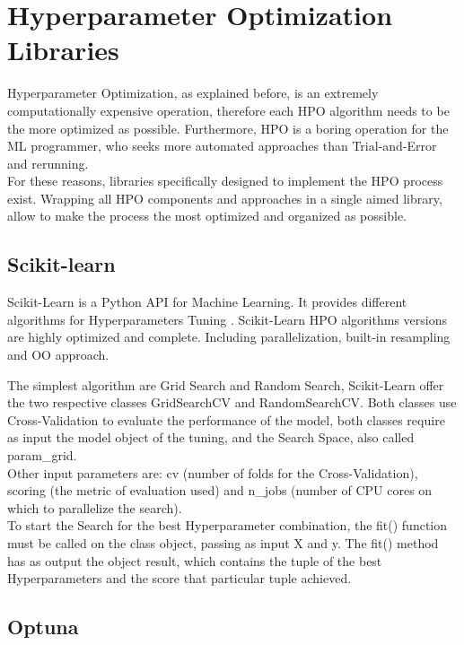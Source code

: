 \section{Hyperparameter Optimization Libraries}

Hyperparameter Optimization, as explained before, is an extremely computationally expensive operation, therefore each HPO algorithm needs to be the more optimized as possible.
Furthermore, HPO is a boring operation for the ML programmer, who seeks more automated approaches than Trial-and-Error and rerunning.
\\[0.3cm]For these reasons, libraries specifically designed to implement the HPO process exist.
Wrapping all HPO components and approaches in a single aimed library, allow to make the process the most optimized and organized as possible.

\subsection{Scikit-learn}

Scikit-Learn is a Python API for Machine Learning. It provides different algorithms for Hyperparameters Tuning \cite{scikit-learn}.
Scikit-Learn HPO algorithms versions are highly optimized and complete. Including parallelization, built-in resampling and OO approach.

The simplest algorithm are Grid Search and Random Search, Scikit-Learn offer the two respective classes GridSearchCV and RandomSearchCV.
Both classes use Cross-Validation to evaluate the performance of the model, both classes require as input the model object of the tuning, and the Search Space, also called param\_grid.
\\[0.3cm]Other input parameters are: cv (number of folds for the Cross-Validation), scoring (the metric of evaluation used) and n\_jobs (number of CPU cores on which to parallelize the search).
\\[0.3cm]To start the Search for the best Hyperparameter combination, the fit() function must be called on the class object, passing as input X and y.
The fit() method has as output the object result, which contains the tuple of the best Hyperparameters and the score that particular tuple achieved.

\subsection{Optuna}

